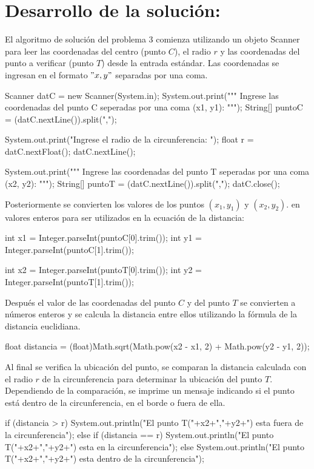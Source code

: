 \documentclass{IEEEcsmag}
\begin{document}
\section*{Desarrollo de la solución:}
El algoritmo de solución del problema 3 comienza utilizando un objeto Scanner para leer las coordenadas del centro (punto $C$), el radio $r$ y las coordenadas del punto a verificar (punto $T$) desde la entrada estándar. Las coordenadas se ingresan en el formato $"x, y"$ separadas por una coma.
\begin{javaCode}
Scanner datC = new Scanner(System.in);
        System.out.print("""
                         Ingrese las coordenadas del punto C 
                         seperadas por una coma (x1, y1):
                         """);
    String[] puntoC = (datC.nextLine()).split(",");
        
    System.out.print("Ingrese el radio de la circunferencia: ");
    float r = datC.nextFloat();
    datC.nextLine();
    
    System.out.print("""
                         Ingrese las coordenadas del punto T
                         seperadas por una coma (x2, y2): 
                         """);
    String[] puntoT = (datC.nextLine()).split(",");
    datC.close();
\end{javaCode}
Posteriormente se convierten los valores de los puntos $(x_{1}, y_{1})$ y $(x_{2}, y_{2})$. en valores enteros para ser utilizados  en la ecuación de la distancia:

\begin{javacode}
    int x1 = Integer.parseInt(puntoC[0].trim());
    int y1 = Integer.parseInt(puntoC[1].trim());
        
    int x2 = Integer.parseInt(puntoT[0].trim());
    int y2 = Integer.parseInt(puntoT[1].trim()); 
\end{javacode}
Después el valor de las coordenadas del punto $C$ y del punto $T$ se convierten a números enteros y se calcula la distancia entre ellos utilizando la fórmula de la distancia euclidiana.
\begin{javacode}
float distancia = (float)Math.sqrt(Math.pow(x2 - x1, 2) + Math.pow(y2 - y1, 2)); 
\end{javacode}

Al final se verifica la ubicación del punto, se comparan la distancia calculada con el radio $r$ de la circunferencia para determinar la ubicación del punto $T$. 
Dependiendo de la comparación, se imprime un mensaje indicando si el punto está dentro de la circunferencia, en el borde o fuera de ella.
\begin{javacode}
if (distancia > r) {
     System.out.println("El punto T("+x2+","+y2+") esta fuera de la circunferencia");
     }else if (distancia == r) {
     System.out.println("El punto T("+x2+","+y2+") esta en la circunferencia");
    }else{
     System.out.println("El punto T("+x2+","+y2+") esta dentro de la circunferencia");
    }
\end{javacode}
\end{document}

